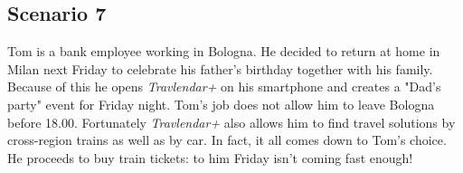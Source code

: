 \subsection{Scenario 7}

Tom is a bank employee working in Bologna. He decided to return at home in Milan next Friday to celebrate his father's birthday together with his family.
Because of this he opens \textit{Travlendar+} on his smartphone and creates a "Dad's party" event for Friday night.
Tom’s job does not allow him to leave Bologna before 18.00. Fortunately \textit{Travlendar+} also allows him to find travel solutions by cross-region trains as well as by car.
In fact, it all comes down to Tom's choice. He proceeds to buy train tickets: to him Friday isn’t coming fast enough!




